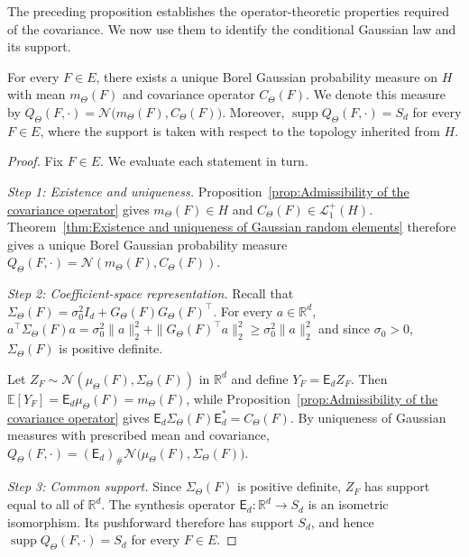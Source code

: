 The preceding proposition establishes the operator-theoretic properties required of the covariance. We now use them to identify the conditional Gaussian law and its support.

\begin{theorem}
\label{thm:Existence and uniqueness of the Gaussian output measure}
For every \(F\in E\), there exists a unique Borel Gaussian probability measure on \(H\) with mean \(m_\Theta(F)\) and covariance operator \(C_\Theta(F)\). We denote this measure by
\(
Q_\Theta(F,\cdot)
=
\mathcal N
\bigl(
m_\Theta(F),
C_\Theta(F)
\bigr).
\)
Moreover, \(\operatorname{supp}Q_\Theta(F,\cdot)=S_d\) for every \(F\in E\), where the support is taken with respect to the topology inherited from \(H\).
\end{theorem}

\begin{proof}
Fix \(F\in E\). We evaluate each statement in turn.

\textit{Step 1: Existence and uniqueness.}
Proposition~\ref{prop:Admissibility of the covariance operator} gives \(m_\Theta(F)\in H\) and \(C_\Theta(F)\in\mathcal L_1^+(H)\). Theorem~\ref{thm:Existence and uniqueness of Gaussian random elements} therefore gives a unique Borel Gaussian probability measure \(Q_\Theta(F,\cdot)=\mathcal N(m_\Theta(F),C_\Theta(F))\).

\textit{Step 2: Coefficient-space representation.}
Recall that \(\Sigma_\Theta(F)=\sigma_0^2I_d+G_\Theta(F)G_\Theta(F)^\top\). For every \(a\in\mathbb R^d\),
\(
a^\top\Sigma_\Theta(F)a
=
\sigma_0^2\|a\|_2^2
+
\|G_\Theta(F)^\top a\|_2^2
\geqslant
\sigma_0^2\|a\|_2^2
\) and since \(\sigma_0>0\), \(\Sigma_\Theta(F)\) is positive definite.

Let \(Z_F\sim\mathcal N(\mu_\Theta(F),\Sigma_\Theta(F))\) in \(\mathbb R^d\) and define \(Y_F=\mathsf E_dZ_F\). Then \(\mathbb E[Y_F]=\mathsf E_d\mu_\Theta(F)=m_\Theta(F)\), while Proposition~\ref{prop:Admissibility of the covariance operator} gives
\(
\mathsf E_d
\Sigma_\Theta(F)
\mathsf E_d^*
=
C_\Theta(F).
\)
By uniqueness of Gaussian measures with prescribed mean and covariance,
\(
Q_\Theta(F,\cdot)
=
(\mathsf E_d)_\#
\mathcal N
\bigl(
\mu_\Theta(F),
\Sigma_\Theta(F)
\bigr).
\)

\textit{Step 3: Common support.}
Since \(\Sigma_\Theta(F)\) is positive definite, \(Z_F\) has support equal to all of \(\mathbb R^d\). The synthesis operator \(\mathsf E_d:\mathbb R^d\to S_d\) is an isometric isomorphism. Its pushforward therefore has support \(S_d\), and hence
\(
\operatorname{supp}
Q_\Theta(F,\cdot)
=
S_d
\)
for every \(F\in E\).
\end{proof}

